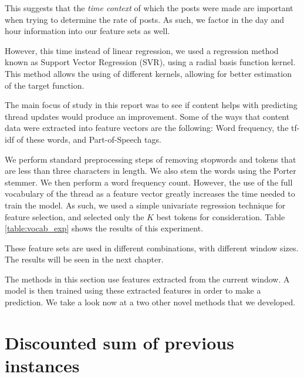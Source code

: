 This suggests that the \emph{time context} of which the posts were made are 
important when trying to determine the rate of posts.  As such, we factor in the 
day and hour information into our feature sets as well.

However, this time instead of linear regression, we used a regression method 
known as Support Vector Regression (SVR), using a radial basis function kernel.  
This method allows the using of different kernels, allowing for better 
estimation of the target function.

The main focus of study in this report was to see if content helps with 
predicting thread updates would produce an improvement. Some of the ways that 
content data were extracted into feature vectors are the following: Word 
frequency, the tf-idf of these words, and Part-of-Speech tags.

We perform standard preprocessing steps of removing stopwords and tokens that are less than three characters in length. We also stem the words using the Porter stemmer.
We then perform a word frequency count. However, the use 
of the full vocabulary of the thread as a feature vector greatly increases the 
time needed to train the model.
 As such, we used a simple univariate regression 
technique for feature selection, and selected only the $K$ best tokens for 
consideration. Table \ref{table:vocab_exp} shows the results of this experiment.  

These feature sets are used in different combinations, with different window 
sizes. The results will be seen in the next chapter.

The methods in this section use features extracted from the current window. A 
model is then trained using these extracted features in order to make a 
prediction. We take a look now at a two other novel methods that we developed.

\section{Discounted sum of previous instances}
 
